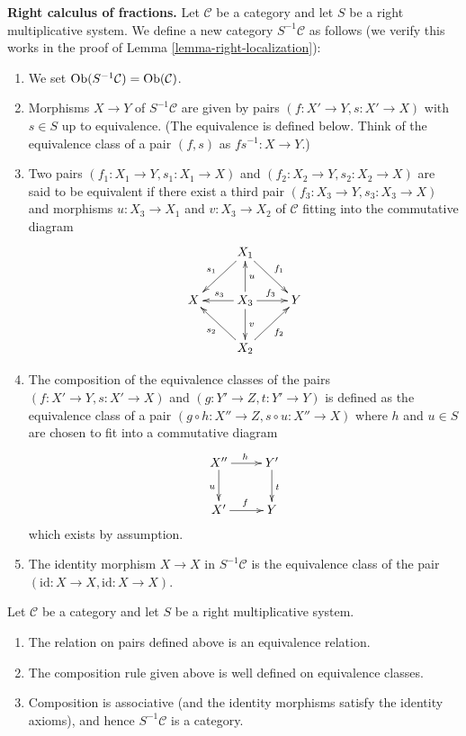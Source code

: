 \noindent
{\bf Right calculus of fractions.}
Let $\mathcal{C}$ be a category and let $S$ be a right multiplicative
system. We define a new category $S^{-1}\mathcal{C}$ as follows
(we verify this works in the proof of
Lemma \ref{lemma-right-localization}):
\begin{enumerate}
\item We set $\mathop{\mathrm{Ob}}\nolimits(S^{-1}\mathcal{C}) = \mathop{\mathrm{Ob}}\nolimits(\mathcal{C})$.
\item Morphisms $X \to Y$ of $S^{-1}\mathcal{C}$ are given by pairs
$(f : X' \to Y, s : X' \to X)$ with $s \in S$ up to equivalence.
(The equivalence is defined below. Think of the equivalence class
of a pair $(f, s)$ as $fs^{-1} : X \to Y$.)
\item Two pairs $(f_1 : X_1 \to Y, s_1 : X_1 \to X)$ and
$(f_2 : X_2 \to Y, s_2 : X_2 \to X)$ are said to be equivalent
if there exist a third pair $(f_3 : X_3 \to Y, s_3 : X_3 \to X)$
and morphisms $u : X_3 \to X_1$ and $v : X_3 \to X_2$ of $\mathcal{C}$
fitting into the commutative diagram
$$
\xymatrix{
 & X_1 \ar[ld]_{s_1} \ar[rd]^{f_1} & \\
X &
X_3 \ar[l]_{s_3} \ar[u]_u \ar[d]^v \ar[r]^{f_3} &
Y \\
& X_2 \ar[lu]^{s_2} \ar[ru]_{f_2} &
}
$$
\item The composition of the equivalence classes of the pairs
$(f : X' \to Y, s : X' \to X)$ and $(g : Y' \to Z, t : Y' \to Y)$
is defined as the equivalence class of a pair
$(g \circ h : X'' \to Z, s \circ u : X'' \to X)$
where $h$ and $u \in S$ are chosen to fit into a commutative diagram
$$
\xymatrix{
X'' \ar[d]_u \ar[r]^h & Y' \ar[d]^t \\
X' \ar[r]^f & Y
}
$$
which exists by assumption.
\item The identity morphism $X \to X$ in $S^{-1} \mathcal{C}$ is the
equivalence class of the pair $(\text{id} : X \to X,
\text{id} : X \to X)$.
\end{enumerate}

\begin{lemma}
\label{lemma-right-localization}
Let $\mathcal{C}$ be a category and let $S$ be a right multiplicative
system.
\begin{enumerate}
\item The relation on pairs defined above is an equivalence relation.
\item The composition rule given above is well defined on equivalence
classes.
\item Composition is associative (and the identity morphisms satisfy
the identity axioms), and hence $S^{-1}\mathcal{C}$ is a category.
\end{enumerate}
\end{lemma}

